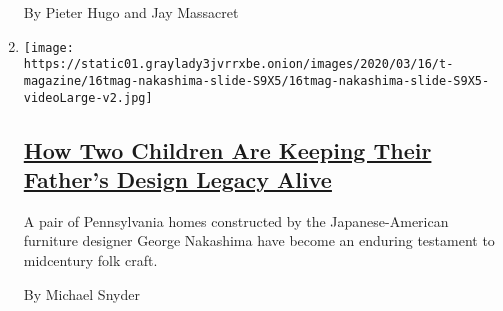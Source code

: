 \begin{enumerate}
  By Pieter Hugo and Jay Massacret
\item
  \texttt{[image: https://static01.graylady3jvrrxbe.onion/images/2020/03/16/t-magazine/16tmag-nakashima-slide-S9X5/16tmag-nakashima-slide-S9X5-videoLarge-v2.jpg]}

  \hypertarget{how-two-children-are-keeping-their-fathers-design-legacy-alive}{%
  \subsection{\texorpdfstring{\href{/2020/03/16/t-magazine/george-nakashima-legacy.html}{How
  Two Children Are Keeping Their Father's Design Legacy
  Alive}}{How Two Children Are Keeping Their Father's Design Legacy Alive}}\label{how-two-children-are-keeping-their-fathers-design-legacy-alive}}

  A pair of Pennsylvania homes constructed by the Japanese-American
  furniture designer George Nakashima have become an enduring testament
  to midcentury folk craft.

  By Michael Snyder
\end{enumerate}

